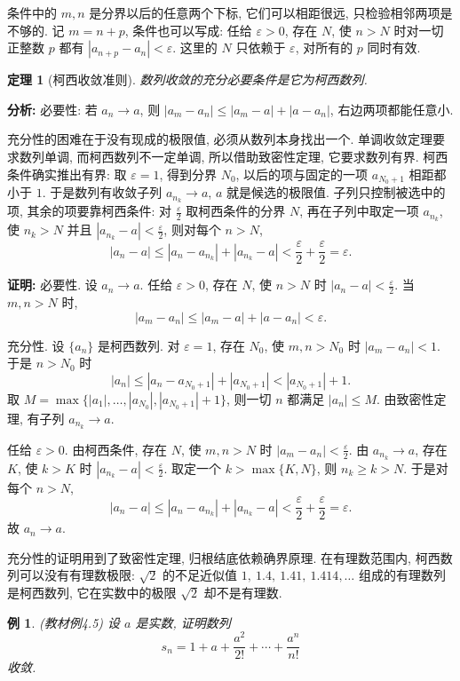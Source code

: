 \documentclass[UTF8,openany]{ctexbook}
\theoremstyle{chinesetextbook}
\newtheorem{example}{例}[section]
\newtheorem{theorem}{定理}[section]
\newenvironment{cnproof}{\par\indent\textbf{证明:} \ignorespaces}{\par}
\begin{document}
条件中的 $m,n$ 是分界以后的任意两个下标, 它们可以相距很远, 只检验相邻两项是不够的. 记 $m=n+p$, 条件也可以写成: 任给 $\varepsilon>0$, 存在 $N$, 使 $n>N$ 时对一切正整数 $p$ 都有 $|a_{n+p}-a_n|<\varepsilon$. 这里的 $N$ 只依赖于 $\varepsilon$, 对所有的 $p$ 同时有效.
\begin{theorem}[柯西收敛准则]
数列收敛的充分必要条件是它为柯西数列.
\end{theorem}
\par\indent\textbf{分析:} 必要性: 若 $a_n\to a$, 则 $|a_m-a_n|\le|a_m-a|+|a-a_n|$, 右边两项都能任意小.

充分性的困难在于没有现成的极限值, 必须从数列本身找出一个. 单调收敛定理要求数列单调, 而柯西数列不一定单调, 所以借助致密性定理, 它要求数列有界. 柯西条件确实推出有界: 取 $\varepsilon=1$, 得到分界 $N_0$, 以后的项与固定的一项 $a_{N_0+1}$ 相距都小于 $1$. 于是数列有收敛子列 $a_{n_k}\to a$, $a$ 就是候选的极限值. 子列只控制被选中的项, 其余的项要靠柯西条件: 对 $\displaystyle\frac\varepsilon2$ 取柯西条件的分界 $N$, 再在子列中取定一项 $a_{n_k}$, 使 $n_k>N$ 并且 $\displaystyle|a_{n_k}-a|<\frac\varepsilon2$, 则对每个 $n>N$,
\[
|a_n-a|\le|a_n-a_{n_k}|+|a_{n_k}-a|<\frac\varepsilon2+\frac\varepsilon2=\varepsilon.
\]
\begin{cnproof}
必要性. 设 $a_n\to a$. 任给 $\varepsilon>0$, 存在 $N$, 使 $n>N$ 时 $\displaystyle|a_n-a|<\frac\varepsilon2$. 当 $m,n>N$ 时,
\[
|a_m-a_n|\le|a_m-a|+|a-a_n|<\varepsilon.
\]

充分性. 设 $\{a_n\}$ 是柯西数列. 对 $\varepsilon=1$, 存在 $N_0$, 使 $m,n>N_0$ 时 $|a_m-a_n|<1$. 于是 $n>N_0$ 时
\[
|a_n|\le|a_n-a_{N_0+1}|+|a_{N_0+1}|<|a_{N_0+1}|+1.
\]
取 $M=\max\{|a_1|,\ldots,|a_{N_0}|,|a_{N_0+1}|+1\}$, 则一切 $n$ 都满足 $|a_n|\le M$. 由致密性定理, 有子列 $a_{n_k}\to a$.

任给 $\varepsilon>0$. 由柯西条件, 存在 $N$, 使 $m,n>N$ 时 $\displaystyle|a_m-a_n|<\frac\varepsilon2$. 由 $a_{n_k}\to a$, 存在 $K$, 使 $k>K$ 时 $\displaystyle|a_{n_k}-a|<\frac\varepsilon2$. 取定一个 $k>\max\{K,N\}$, 则 $n_k\ge k>N$. 于是对每个 $n>N$,
\[
|a_n-a|\le|a_n-a_{n_k}|+|a_{n_k}-a|<\frac\varepsilon2+\frac\varepsilon2=\varepsilon.
\]
故 $a_n\to a$.
\end{cnproof}
充分性的证明用到了致密性定理, 归根结底依赖确界原理. 在有理数范围内, 柯西数列可以没有有理数极限: $\sqrt2$ 的不足近似值 $1,\ 1.4,\ 1.41,\ 1.414,\ldots$ 组成的有理数列是柯西数列, 它在实数中的极限 $\sqrt2$ 却不是有理数.
\begin{example}\label{ex:4-5}
\textnormal{(教材例4.5)} 设 $a$ 是实数, 证明数列
\[
s_n=1+a+\frac{a^2}{2!}+\cdots+\frac{a^n}{n!}
\]
收敛.
\end{example}
\end{document}
